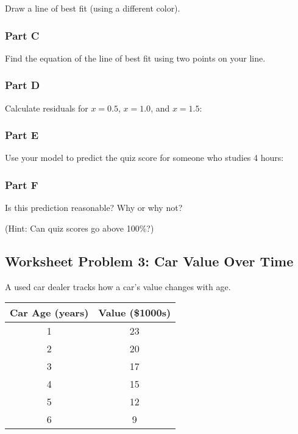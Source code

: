 \documentclass[12pt]{article}
\begin{document}
				Draw a line of best fit (using a different color).

				\newpage

			\subsubsection*{Part C}

				Find the equation of the line of best fit using two points on your line.

				\vspace{5cm}

			\subsubsection*{Part D}
				
				Calculate residuals for $x = 0.5$, $x = 1.0$, and $x = 1.5$:

				\vspace{5cm}

			\subsubsection*{Part E}
				
				Use your model to predict the quiz score for someone who studies 4 hours:

				\vspace{2cm}

			\subsubsection*{Part F}
			
				Is this prediction reasonable? Why or why not?

				(Hint: Can quiz scores go above 100\%?)

				\vspace{2cm}

				\newpage

		\subsection*{Worksheet Problem 3: Car Value Over Time}

			A used car dealer tracks how a car's value changes with age.

			\begin{center}
				\begin{tabular}{|c|c|}
					\hline
					Car Age (years) & Value (\$1000s) \\
					\hline
					1 & 23 \\
					2 & 20 \\
					3 & 17 \\
					4 & 15 \\
					5 & 12 \\
					6 & 9 \\
					\hline
				\end{tabular}
			\end{center}
\end{document}
